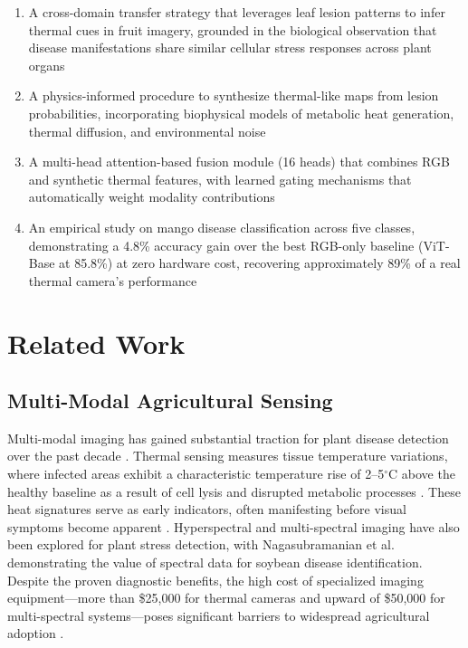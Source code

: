 \documentclass[utf8]{FrontiersinHarvard} %
\begin{document}
\begin{enumerate}
    \item A cross-domain transfer strategy that leverages leaf lesion patterns to infer thermal cues in fruit imagery, grounded in the biological observation that disease manifestations share similar cellular stress responses across plant organs
    \item A physics-informed procedure to synthesize thermal-like maps from lesion probabilities, incorporating biophysical models of metabolic heat generation, thermal diffusion, and environmental noise
    \item A multi-head attention-based fusion module (16 heads) that combines RGB and synthetic thermal features, with learned gating mechanisms that automatically weight modality contributions
    \item An empirical study on mango disease classification across five classes, demonstrating a 4.8\% accuracy gain over the best RGB-only baseline (ViT-Base at 85.8\%) at zero hardware cost, recovering approximately 89\% of a real thermal camera's performance
\end{enumerate}

\section{Related Work}

\subsection{Multi-Modal Agricultural Sensing}
Multi-modal imaging has gained substantial traction for plant disease detection over the past decade \cite{maimaitijiang2020,lu2020}. Thermal sensing measures tissue temperature variations, where infected areas exhibit a characteristic temperature rise of 2--5$^{\circ}$C above the healthy baseline as a result of cell lysis and disrupted metabolic processes \cite{mahlein2016}. These heat signatures serve as early indicators, often manifesting before visual symptoms become apparent \cite{pineda2021}. Hyperspectral and multi-spectral imaging have also been explored for plant stress detection, with Nagasubramanian et al. \cite{nagasubramanian2019} demonstrating the value of spectral data for soybean disease identification. Despite the proven diagnostic benefits, the high cost of specialized imaging equipment---more than \$25,000 for thermal cameras and upward of \$50,000 for multi-spectral systems---poses significant barriers to widespread agricultural adoption \cite{sishodia2020}.
\end{document}
